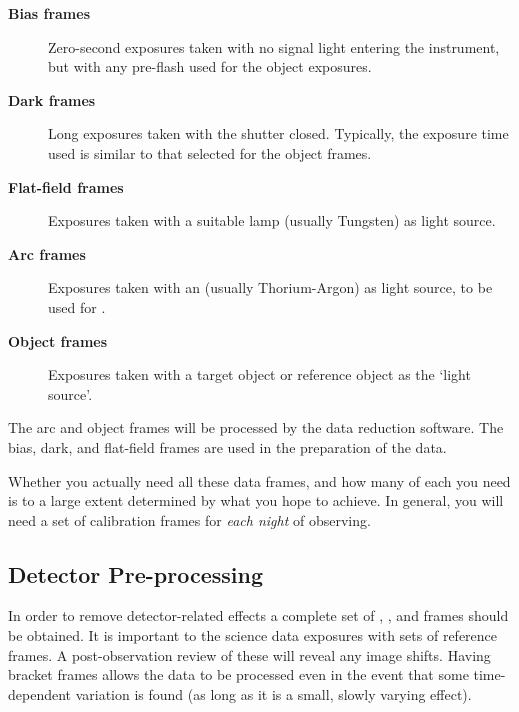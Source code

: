 \begin{description}

\item [{\bf Bias frames}]
      Zero-second exposures taken with no signal light entering the
      instrument, but with any pre-flash used for the object exposures.

\item [{\bf Dark frames}]
      Long exposures taken with the shutter closed.  Typically, the
      exposure time used is similar to that selected for the object
      frames.

\item [{\bf Flat-field frames}]
      Exposures taken with a suitable 
      lamp (usually Tungsten) as light source.

\item [{\bf Arc frames}]
      Exposures taken with an 
      (usually Thorium-Argon) as
      light source, to be used for .

\item [{\bf Object frames}]
      Exposures taken with a target object or reference object as the
      `light source'.

\end{description}

The arc and object frames will be processed by the data reduction software.
The bias, dark, and flat-field frames are used in the preparation of the
 data.

Whether you actually need all these data frames, and how many of each
you need is to a large extent determined by what you hope to achieve.
In general, you will need a set of calibration frames for {\em each
night} of observing.


\subsection{Detector Pre-processing}

In order to remove detector-related effects a complete set of
, ,
and
 frames should be obtained.
It is important to {\em
{}} the science data exposures with
sets of 
reference frames.  A post-observation review of these will reveal
any image shifts.  Having bracket frames allows the data to be
processed even in the event that some time-dependent variation
is found (as long as it is a small, slowly varying effect).

